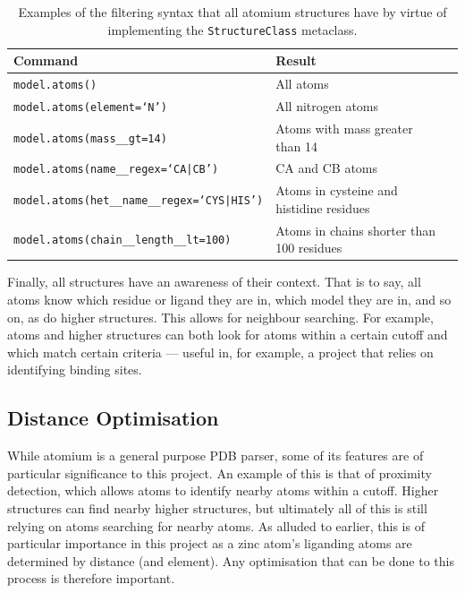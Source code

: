 \begin{table}
\begin{center}
\begin{tabular}{llr} \hline
Command                         & Result \\ \hline
\texttt{model.atoms()}                        & All atoms  \\
\texttt{model.atoms(element=`N')}                 & All nitrogen atoms \\
\texttt{model.atoms(mass\_\_gt=14)}                 & Atoms with mass greater than 14 \\
\texttt{model.atoms(name\_\_regex=`CA|CB')}             & CA and CB atoms  \\
\texttt{model.atoms(het\_\_name\_\_regex=`CYS|HIS')}    & Atoms in cysteine and histidine residues \\
\texttt{model.atoms(chain\_\_length\_\_lt=100)}     & Atoms in chains shorter than 100 residues \\ \hline
\end{tabular}
\end{center}
\caption{\label{tab:filtering}Examples of the filtering syntax that all atomium structures have by virtue of implementing the \texttt{StructureClass} metaclass.} 
\end{table}

Finally, all structures have an awareness of their context. That is to say, all atoms know which residue or ligand they are in, which model they are in, and so on, as do higher structures. This allows for neighbour searching. For example, atoms and higher structures can both look for atoms within a certain cutoff and which match certain criteria --- useful in, for example, a project that relies on identifying binding sites.

\subsection{Distance Optimisation}

While atomium is a general purpose PDB parser, some of its features are of particular significance to this project. An example of this is that of proximity detection, which allows atoms to identify nearby atoms within a cutoff. Higher structures can find nearby higher structures, but ultimately all of this is still relying on atoms searching for nearby atoms. As alluded to earlier, this is of particular importance in this project as a zinc atom's liganding atoms are determined by distance (and element). Any optimisation that can be done to this process is therefore important.

